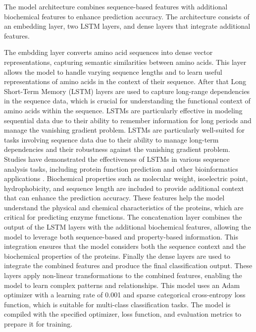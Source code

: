 The model architecture combines sequence-based features with additional biochemical features to enhance prediction accuracy. The architecture consists of an embedding layer, two LSTM layers, and dense layers that integrate additional features.



The embdding layer converts amino acid sequences into dense vector representations, capturing semantic similarities between amino acids. This layer allows the model to handle varying sequence lengths and to learn useful representations of amino acids in the context of their sequence. After that Long Short-Term Memory (LSTM) layers are used to capture long-range dependencies in the sequence data, which is crucial for understanding the functional context of amino acids within the sequence. LSTMs are particularly effective in modeling sequential data due to their ability to remember information for long periods and manage the vanishing gradient problem. LSTMs are particularly well-suited for tasks involving sequence data due to their ability to manage long-term dependencies and their robustness against the vanishing gradient problem. Studies have demonstrated the effectiveness of LSTMs in various sequence analysis tasks, including protein function prediction and other bioinformatics applications \autocite{liuAttentionMechanismEnhanced2019} \autocite{zhangEncoderdecoderModelsSequencetosequence2023}. Biochemical properties such as molecular weight, isoelectric point, hydrophobicity, and sequence length are included to provide additional context that can enhance the prediction accuracy. These features help the model understand the physical and chemical characteristics of the proteins, which are critical for predicting enzyme functions. The concatenation layer combines the output of the LSTM layers with the additional biochemical features, allowing the model to leverage both sequence-based and property-based information. This integration ensures that the model considers both the sequence context and the biochemical properties of the proteins. Finally the dense layers are used to integrate the combined features and produce the final classification output. These layers apply non-linear transformations to the combined features, enabling the model to learn complex patterns and relationships.
This model uses an Adam optimizer with a learning rate of 0.001 and sparse categorical cross-entropy loss function, which is suitable for multi-class classification tasks. The model is compiled with the specified optimizer, loss function, and evaluation metrics to prepare it for training.